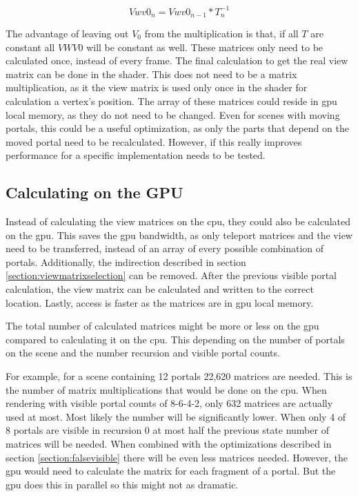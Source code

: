 $$Vwv0_n = Vwv0_{n-1} * T_n^{-1}$$

The advantage of leaving out $V_0$ from the multiplication is that, if all $T$ are constant all $VWV0$ will be constant as well. These matrices only need to be calculated once, instead of every frame. The final calculation to get the real view matrix can be done in the shader. This does not need to be a matrix multiplication, as it the view matrix is used only once in the shader for calculation a vertex's position. The array of these matrices could reside in \gls{gpu} local memory, as they do not need to be changed. Even for scenes with moving portals, this could be a useful optimization, as only the parts that depend on the moved portal need to be recalculated. However, if this really improves performance for a specific implementation needs to be tested.

\subsection{Calculating on the GPU}
Instead of calculating the view matrices on the \gls{cpu}, they could also be calculated on the \gls{gpu}.
This saves the \gls{gpu} bandwidth, as only teleport matrices and the view need to be transferred, instead of an array of every possible combination of portals. Additionally, the indirection described in section \ref{section:viewmatrixselection} can be removed. After the previous visible portal calculation, the view matrix can be calculated and written to the correct location. Lastly, access is faster as the matrices are in \gls{gpu} local memory.

The total number of calculated matrices might be more or less on the \gls{gpu} compared to calculating it on the \gls{cpu}. This depending on the number of portals on the scene and the number recursion and visible portal counts. 

For example, for a scene containing 12 portals 22,620 matrices are needed. This is the number of matrix multiplications that would be done on the \gls{cpu}. When rendering with visible portal counts of 8-6-4-2, only 632 matrices are actually used at most. Most likely the number will be significantly lower. When only 4 of 8 portals are visible in recursion 0 at most half the previous state number of matrices will be needed. When combined with the optimizations described in section \ref{section:falsevisible} there will be even less matrices needed. However, the \gls{gpu} would need to calculate the matrix for each fragment of a portal. But the \gls{gpu} does this in parallel so this might not as dramatic. 

